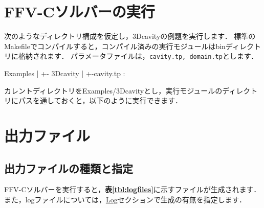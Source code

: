 \graphicspath{{./fig_Exec/}}
%

\section{FFV-Cソルバーの実行}

次のようなディレクトリ構成を仮定し，3Dcavityの例題を実行します．
標準のMakefileでコンパイルすると，コンパイル済みの実行モジュールはbinディレクトリに格納されます．
パラメータファイルは，\verb|cavity.tp, domain.tp|とします．

{\small
\begin{program}
Examples
  |
  +- 3Dcavity
  |    +-cavity.tp
  :
\end{program}
}

カレントディレクトリをExamples/3Dcavityとし，実行モジュールのディレクトリにパスを通しておくと，以下のように実行できます．

{\small
{}
}

%
\pagebreak
\section{出力ファイル}

\subsection{出力ファイルの種類と指定}
\label{sec:log_files}

FFV-Cソルバーを実行すると，\textbf{表\ref{tbl:logfiles}}に示すファイルが生成されます．
また，logファイルについては，\hyperlink{tgt:log}{Log}セクションで生成の有無を指定します．

